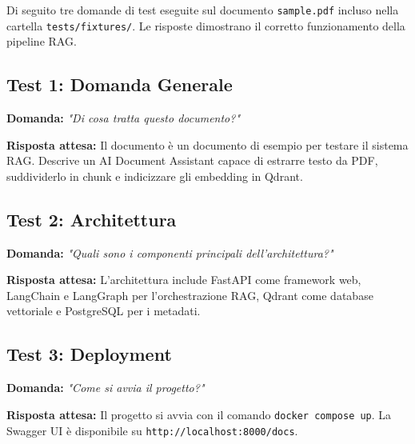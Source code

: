 Di seguito tre domande di test eseguite sul documento \texttt{sample.pdf} incluso
nella cartella \texttt{tests/fixtures/}. Le risposte dimostrano il corretto funzionamento
della pipeline RAG.

\subsection{Test 1: Domanda Generale}

\textbf{Domanda:} \emph{"Di cosa tratta questo documento?"}

\textbf{Risposta attesa:}
Il documento è un documento di esempio per testare il sistema RAG. Descrive un
AI Document Assistant capace di estrarre testo da PDF, suddividerlo in chunk e
indicizzare gli embedding in Qdrant.

\subsection{Test 2: Architettura}

\textbf{Domanda:} \emph{"Quali sono i componenti principali dell'architettura?"}

\textbf{Risposta attesa:}
L'architettura include FastAPI come framework web, LangChain e LangGraph per
l'orchestrazione RAG, Qdrant come database vettoriale e PostgreSQL per i metadati.

\subsection{Test 3: Deployment}

\textbf{Domanda:} \emph{"Come si avvia il progetto?"}

\textbf{Risposta attesa:}
Il progetto si avvia con il comando \texttt{docker compose up}. La Swagger UI
è disponibile su \texttt{http://localhost:8000/docs}.
